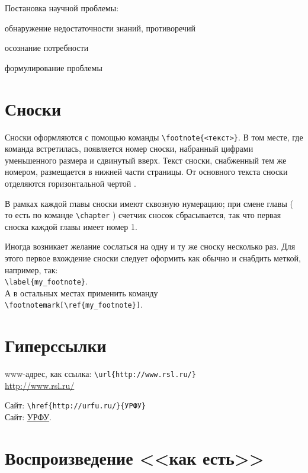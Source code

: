 Постановка научной проблемы:
\begin{compactlist}
\item обнаружение недостаточности знаний, противоречий
\item осознание потребности
\item формулирование проблемы
\end{compactlist}

\section{Сноски}

Сноски оформляются с помощью команды \verb|\footnote{<текст>}|. В том месте, где команда встретилась, появляется номер сноски, набранный цифрами уменьшенного размера и сдвинутый вверх. Текст сноски, снабженный тем же номером, размещается в нижней части страницы. От основного текста сноски отделяются горизонтальной чертой \cite[][с.~58]{__2010}. 

В рамках каждой главы сноски имеют сквозную нумерацию; при смене главы ( то есть по команде \verb|\chapter| ) счетчик сносок сбрасывается, так что первая сноска каждой главы имеет номер 1.

Иногда возникает желание сослаться на одну и ту же сноску несколько раз. Для этого первое вхождение сноски следует оформить как обычно и снабдить меткой, например, так:\\ 
\verb|\label{my_footnote}|. \\
А в остальных местах применить команду\\
\verb|\footnotemark[\ref{my_footnote}]|.

\section{Гиперссылки}

www-адрес, как ссылка: \verb|\url{http://www.rsl.ru/}|\\
\url{http://www.rsl.ru/}

Сайт: \verb|\href{http://urfu.ru/}{УРФУ}|\\
Сайт: \href{http://urfu.ru/}{УРФУ}.


\section{Воспроизведение <<как есть>>}\label{verb}

